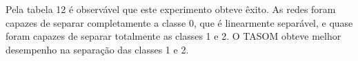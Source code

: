 Pela tabela 12 é observável que este experimento obteve êxito. As redes foram capazes de separar completamente a classe 0, que é linearmente separável, e quase foram capazes de separar totalmente as classes 1 e 2. O TASOM obteve melhor desempenho na separação das classes 1 e 2.  



	  

 















